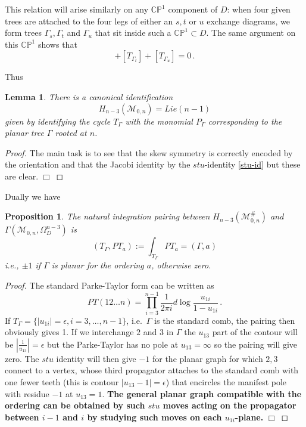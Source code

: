 \documentclass[11pt]{article}
\newcommand{\CP}{\mathbb{CP}}
\newcommand{\cM}{\mathcal{M}}
\newcommand{\1}{{\rm 1\hskip-0.25em I}}
\newtheorem{propn}{Proposition}[section]
\newtheorem{lemma}{Lemma}[section]
\begin{document}
 This relation will arise similarly on any $\CP^1$  component of $D$:  when four given trees are attached to the four legs of either an $s,t$ or $u$ exchange diagrams, we form trees $\Gamma_s, \Gamma_t$ and $\Gamma_u$  that sit inside such a $\CP^1 \subset D$.  The same argument on this $\CP^1$ shows that 
\begin{equation}
[T_{\Gamma_s}]+[T_{\Gamma_t}]+[T_{\Gamma_u}]=0\, .\label{stu-id}
\end{equation}

Thus
\begin{lemma}
There is a canonical identification 
\begin{equation}
 H_{n-3}(\cM_{0,n})= Lie(n-1)
\end{equation}
given by identifying the cycle $T_\Gamma$ with the monomial $P_\Gamma$ corresponding to the planar tree $\Gamma$ rooted at $n$.
\end{lemma}

\begin{proof}
The main task is to see that the skew symmetry is correctly encoded by the orientation and that the Jacobi identity by the $stu$-identity \eqref{stu-id} but these are clear. $\Box$
\end{proof}


\smallskip




Dually we have 
\begin{propn}\label{T-PT-pairing}
The natural integration pairing  between $H_{n-3}(\cM^\#_{0,n})$ and $\Gamma(\cM_{0,n},\Omega^{n-3}_D)$ is \begin{equation}
(T_\Gamma,PT_a):=\int_{T_\Gamma}PT_a =(\Gamma,a)
\end{equation}
i.e., $\pm 1$ if $\Gamma $ is planar for the ordering $a$, otherwise zero. \end{propn}

\begin{proof}
The standard Parke-Taylor form can be written as 
\begin{equation}
PT(12\ldots n)=\prod_{i=3}^{n-1} \frac{1}{2\pi i}d\log \frac{ u_{1i}}{1- u_{1i}}\, .\label{comb-PT}
\end{equation}
If $T_\Gamma=\{|u_{1i}|=\epsilon, i=3,\ldots ,n-1\}$, i.e.\ $\Gamma $ is the standard comb, the pairing then obviously gives  1. If  we interchange $2$ and $3$ in $\Gamma$ the $u_{13}$ part of the contour will be $|\frac1{u_{13}}|=\epsilon$ but the Parke-Taylor has no pole at $u_{13}=\infty$ so the pairing will give zero. The $stu$ identity will then give $- 1$ for the planar graph for which $2,3$ connect to a vertex, whose third propagator  attaches to the standard comb with one fewer teeth (this is contour $|u_{13}-1|=\epsilon$) that encircles the manifest pole with residue $-1$ at $u_{13}=1$. {\bf The general planar graph compatible with the ordering can be obtained by such $stu$ moves acting on the propagator between $i-1$ and $i$ by studying such moves on each $u_{1i}$-plane.} $\Box$
\end{proof}
\end{document}
